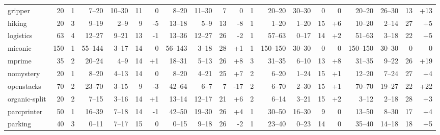 \documentclass{article}
\begin{document}
\begin{table}[h]
\begin{tabular}{l@{}rr|rrrr|rrrr|r|rrrr|rrrr}
       gripper &     20 &   1 &    7--20 &  10--30 &  11 &                 0 &    8--20 &  11--30 &   7 &                  0 &   1 &    20--20 &  30--30 &   0 &                  0 &    20--20 &  26--30 &  13 &  {\color{blue}+13} \\
        hiking &     20 &   3 &    9--19 &    2--9 &   9 &   {\color{red}-5} &   13--18 &    5--9 &  13 &    {\color{red}-8} &   1 &     1--20 &   1--20 &  15 &   {\color{blue}+6} &    10--20 &   2--14 &  27 &   {\color{blue}+5} \\
     logistics &     63 &   4 &   12--27 &   9--21 &  13 &   {\color{red}-1} &   13--36 &  12--27 &  26 &    {\color{red}-2} &   1 &    57--63 &   0--17 &  14 &   {\color{blue}+2} &    51--63 &   3--18 &  22 &   {\color{blue}+5} \\
       miconic &    150 &   1 &  55--144 &   3--17 &  14 &                 0 &  56--143 &   3--18 &  28 &   {\color{blue}+1} &   1 &  150--150 &  30--30 &   0 &                  0 &  150--150 &  30--30 &   0 &                  0 \\
        mprime &     35 &   2 &   20--24 &    4--9 &  14 &  {\color{blue}+1} &   18--31 &   5--13 &  26 &   {\color{blue}+8} &   3 &    31--35 &   6--10 &  13 &   {\color{blue}+8} &    31--35 &   9--22 &  26 &  {\color{blue}+19} \\
     nomystery &     20 &   1 &    8--20 &   4--13 &  14 &                 0 &    8--20 &   4--21 &  25 &   {\color{blue}+7} &   2 &     6--20 &   1--24 &  15 &   {\color{blue}+1} &    12--20 &   7--24 &  27 &   {\color{blue}+4} \\
    openstacks &     70 &   2 &   23--70 &   3--15 &   9 &   {\color{red}-3} &   42--64 &    6--7 &   7 &   {\color{red}-17} &   2 &     6--70 &   2--30 &  15 &   {\color{blue}+1} &    70--70 &  19--27 &  22 &  {\color{blue}+22} \\
 organic-split &     20 &   2 &    7--15 &   3--16 &  14 &  {\color{blue}+1} &   13--14 &  12--17 &  21 &   {\color{blue}+6} &   2 &     6--14 &   3--21 &  15 &   {\color{blue}+2} &     3--12 &   2--18 &  28 &   {\color{blue}+3} \\
   parcprinter &     50 &   1 &   16--39 &   7--18 &  14 &   {\color{red}-1} &   42--50 &  19--30 &  26 &   {\color{blue}+4} &   1 &    30--50 &  16--30 &   9 &                  0 &    13--50 &   8--30 &  17 &   {\color{blue}+4} \\
       parking &     40 &   3 &    0--11 &   7--17 &  15 &                 0 &    0--15 &   9--18 &  26 &    {\color{red}-2} &   1 &    23--40 &   0--23 &  14 &                  0 &    35--40 &  14--18 &  18 &   {\color{blue}+5} \\

\end{tabular}
\end{table}
\end{document}
